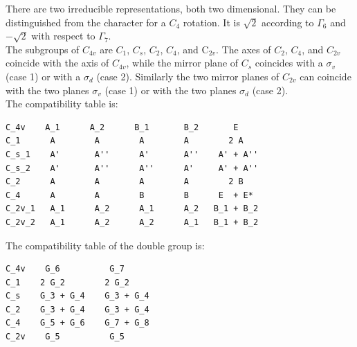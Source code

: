\documentclass[12pt,a4paper]{article}
\begin{document}
There are two irreducible representations, both two dimensional. They can be
distinguished from the character for a $C_4$ rotation. It is
$\sqrt{2}$ according to $\Gamma_6$ and $-\sqrt{2}$ with respect to 
$\Gamma_7$. \\
The subgroups of $C_{4v}$ are $C_1$, $C_s$, $C_2$, $C_4$, and C$_{2v}$. 
The axes of $C_2$, $C_4$, and $C_{2v}$ coincide with the axis of $C_{4v}$, 
while the mirror plane of $C_s$ coincides with a $\sigma_v$ 
(case 1) or with a $\sigma_d$ (case 2). Similarly the two
mirror planes of $C_{2v}$ can coincide with the two planes $\sigma_v$ 
(case 1) or with the two planes $\sigma_d$ (case 2).\\
The compatibility table is:
\begin{verbatim}
C_4v    A_1      A_2      B_1       B_2       E
C_1      A        A        A        A        2 A
C_s_1    A'       A''      A'       A''    A' + A''
C_s_2    A'       A''      A''      A'     A' + A''
C_2      A        A        A        A        2 B
C_4      A        A        B        B      E  + E*   
C_2v_1   A_1      A_2      A_1      A_2   B_1 + B_2
C_2v_2   A_1      A_2      A_2      A_1   B_1 + B_2
\end{verbatim}
The compatibility table of the double group is:
\begin{verbatim}
C_4v    G_6          G_7  
C_1    2 G_2        2 G_2
C_s    G_3 + G_4    G_3 + G_4
C_2    G_3 + G_4    G_3 + G_4
C_4    G_5 + G_6    G_7 + G_8
C_2v    G_5          G_5
\end{verbatim}
\end{document}
